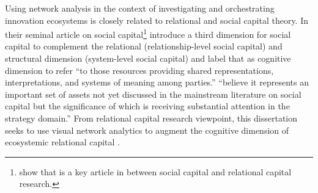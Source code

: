 Using network analysis in the context of investigating and orchestrating innovation ecosystems is closely related to relational and social capital theory. In their seminal article on social capital\footnote{\cite{Still2013relationalsocialcapital} show that \cite{Nahapiet1998} is a key article in between social capital and relational capital research.} \cite{Nahapiet1998} introduce a third dimension  for social capital to complement the relational (relationship-level social capital) and structural dimension (system-level social capital) and label that as cognitive dimension to refer ``to those resources providing shared representations, interpretations, and systems of meaning among parties.'' \cite{Nahapiet1998} ``believe it represents an important set of assets not yet discussed in the mainstream literature on social capital but the significance of which is receiving substantial attention in the strategy domain.'' From relational capital research viewpoint, this dissertation seeks to use visual network analytics to augment the cognitive dimension of ecosystemic relational capital \citep{Still2014EcosystemicRelationalCapital}.